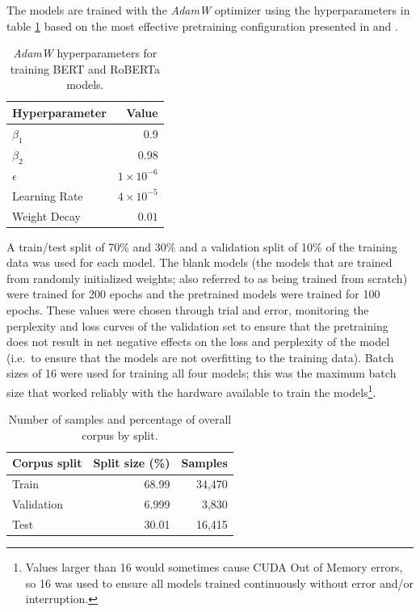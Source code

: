 \documentclass[12pt]{article}
\begin{document}
The models are trained with the \textit{AdamW} optimizer \cite{loshchilov_decoupled_2019} using the hyperparameters in table \ref{tab:optim_params}
based on the most effective pretraining configuration presented in \cite{devlin_bert_2019} and \cite{liu_roberta_2019}.

\begin{table}[h!]
    \centering
    \begin{tabular}{l r}
        \toprule
        Hyperparameter & Value              \\
        \midrule
        $\beta_1$      & $0.9$              \\
        $\beta_2$      & $0.98$             \\
        $\epsilon$     & $1 \times 10^{-6}$ \\
        Learning Rate  & $4 \times 10^{-5}$ \\
        Weight Decay   & $0.01$             \\
        \bottomrule
    \end{tabular}
    \caption{\textit{AdamW} hyperparameters for training BERT and RoBERTa models.}
    \label{tab:optim_params}
\end{table}

A train/test split of 70\% and 30\% and a validation split of 10\% of the training data was used for each model. The blank models (the models that are
trained from randomly initialized weights; also referred to as being trained from scratch) were trained for 200 epochs and the pretrained models were
trained for 100 epochs. These values were chosen through trial and error, monitoring the perplexity and loss curves of the
validation set to ensure that the pretraining does not result in net negative effects on the loss and perplexity of the model (i.e.~to ensure that the
models are not overfitting to the training data). Batch sizes of 16 were used for training all four models; this was the maximum batch size that
worked reliably with the hardware available to train the models\footnote{Values larger than 16 would sometimes cause CUDA Out of Memory errors, so 16
    was used to ensure all models trained continuously without error and/or interruption.}.

\begin{table}
    \centering
    \begin{tabular}{l r r}
        \toprule
        Corpus split & Split size (\%) & Samples \\
        \midrule
        Train        & 68.99           & 34,470  \\
        Validation   & 6.999           & 3,830   \\
        Test         & 30.01           & 16,415  \\
        \bottomrule
    \end{tabular}
    \caption{Number of samples and percentage of overall corpus by split.}
    \label{tab:corpus_splits}
\end{table}
\end{document}
